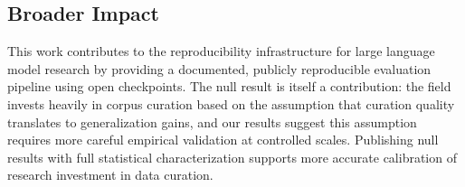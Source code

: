 \subsection{Broader Impact}

This work contributes to the reproducibility infrastructure for large language model research by providing a documented, publicly reproducible evaluation pipeline using open checkpoints. The null result is itself a contribution: the field invests heavily in corpus curation based on the assumption that curation quality translates to generalization gains, and our results suggest this assumption requires more careful empirical validation at controlled scales. Publishing null results with full statistical characterization supports more accurate calibration of research investment in data curation.
